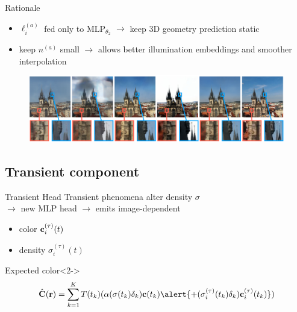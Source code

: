 \documentclass[aspectratio=1610]{beamer}
\begin{document}
\begin{frame}{Rationale}
    \begin{itemize}
        \item \(\ell_i^{(a)}\) fed only to MLP\(_{\theta_2}\) \(\rightarrow\) keep 3D geometry prediction static
        \item keep \(n^{(a)}\) small \(\rightarrow\) allows better illumination embeddings and smoother interpolation
    \end{itemize}
    \bigskip
    \begin{figure}[H]
        \centering
        \includegraphics[width=\textwidth,keepaspectratio]{nerfa-results.png}
    \end{figure}
\end{frame}

\subsection*{Transient component}
\begin{frame}{Transient Head}
    Transient phenomena alter density \(\sigma\)\\
    \pause
    \(\rightarrow\) new MLP head \pause \(\rightarrow\) emits image-dependent
    \begin{itemize}
        \item color \(\vb{c}_i^{(\tau)}(t)\)
        \item density \(\sigma_i^{(\tau)}(t)\)
    \end{itemize}
    \bigskip
    \begin{block}{Expected color}<2->
        \begin{equation*}
            \hat{\vb{C}}(\vb{r}) = \sum_{k = 1}^{K} T(t_k) ( \alpha (\sigma (t_k)\delta_k)  \vb{c}(t_k)  \alert{+ (\sigma_i^{(\tau)} (t_k)\delta_k)  \vb{c}_i^{(\tau)}(t_k)})
        \end{equation*}
    \end{block}
\end{frame}
\end{document}
